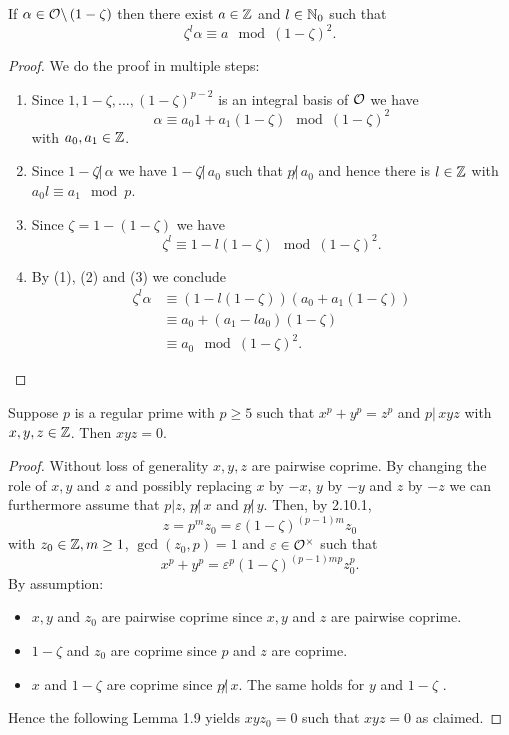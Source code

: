 \begin{Lem} If $\alpha \in \mathcal{O} \backslash \left(1-\zeta\right)$ then there exist $a \in \mathbb{Z}$
	and $l \in \mathbb{N}_0$ such that
	\[ \zeta^l \alpha \equiv a \mod (1-\zeta)^2.
	\]
\end{Lem}


\begin{proof} We do the proof in multiple steps:
	\begin{enumerate}[(1)]
		\item Since $1, 1- \zeta, \dots, (1-\zeta)^{p-2}$ is an integral basis 
				of $\mathcal{O}$ we have
				\[ \alpha \equiv a_0 1 + a_1 (1-\zeta) \mod (1-\zeta)^2
				\]
				with $a_0, a_1 \in \mathbb{Z}$.
		\item Since $1-\zeta \not | \, \alpha $ we have $1-\zeta \not | \, a_0 $
				such that $p \not | \, a_0$ and hence there is $l \in\mathbb{Z}$ with
				$a_0 l \equiv a_1 \mod p$.
		\item Since $\zeta = 1-(1-\zeta)$ we have
				\[ \zeta^l \equiv 1- l(1-\zeta) \mod (1-\zeta)^2.
				\]
		\item By (1), (2) and (3) we conclude
				\begin{align*}
				\zeta^l \alpha
				&\equiv \left( 1-l(1-\zeta) \right) \left( a_0 + a_1(1-\zeta) \right)\\
				&\equiv a_0 + \left(a_1 -l a_0  \right) (1-\zeta)\\
				&\equiv a_0 \mod (1-\zeta)^2.
				\end{align*}
	\end{enumerate}
\end{proof}


\begin{Prop}
	Suppose $p$ is a regular prime with $p \geq 5$ such that 
	$x^p +y^p = z^p$ and $p  | \, xyz$ with $x,y,z \in \mathbb{Z}$.
	Then $xyz = 0$.
\end{Prop}


\begin{proof}
	Without loss of generality $x,y,z$ are pairwise coprime.
	By changing the role of $x,y$ and $z$ and possibly replacing $x$ by $-x$, $y$ by $-y$ and $z$ by $-z$ we can furthermore assume that $p | z$, $p \not | \, x$
	and $p \not | \, y$. 
	Then, by 2.10.1,
	\[ z = p^m z_0 = \varepsilon \left(1-\zeta\right)^{(p-1)m} z_0
	\]  
	with $z_0 \in \mathbb{Z}, m \geq 1$, $\gcd(z_0,p)=1$ and $\varepsilon \in \mathcal{O}^\times$
	such that
	\[ x^p+y^p = \varepsilon^p \left(1-\zeta\right)^{(p-1)mp} z_0^p .
	\]
	By assumption:
	\begin{itemize}
		\item $x,y$ and $z_0$ are pairwise coprime since $x,y$ and $z$ are pairwise coprime.
		\item $1-\zeta$ and $z_0$ are coprime since $p$ and $z$ are coprime.
		\item $x$ and $1-\zeta$ are coprime since $p \not | \, x$. The same holds for $y$ and $1-\zeta$ .
	\end{itemize}
	Hence the following Lemma 1.9 yields $xyz_0 = 0$ such that $xyz = 0$ as claimed.
\end{proof}
 
